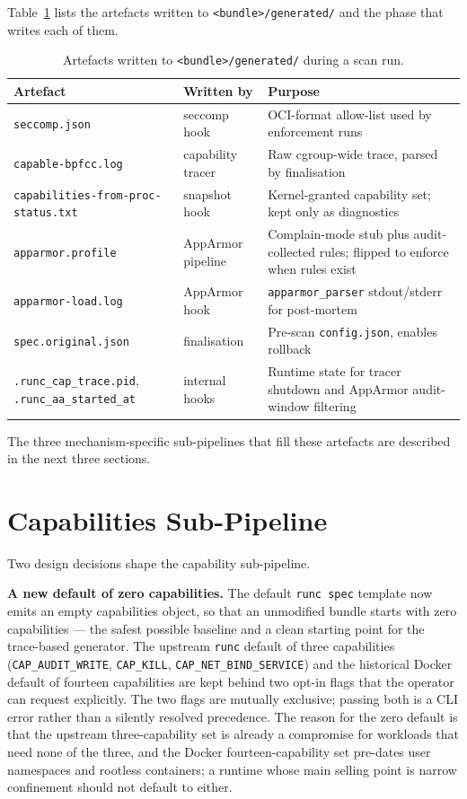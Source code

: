 Table~\ref{tab:artefacts} lists the artefacts written to \texttt{<bundle>/generated/} and the phase that writes each of them.

\begin{table}[ht]
\centering
\caption{Artefacts written to \texttt{<bundle>/generated/} during a scan run.}
\label{tab:artefacts}
\begin{tabular}{p{4.8cm}p{2.6cm}p{7.0cm}}
\toprule
\textbf{Artefact} & \textbf{Written by} & \textbf{Purpose} \\
\midrule
\texttt{seccomp.json} & seccomp hook & OCI-format allow-list used by enforcement runs \\
\texttt{capable-bpfcc.log} & capability tracer & Raw cgroup-wide trace, parsed by finalisation \\
\texttt{capabilities-from-proc-status.txt} & snapshot hook & Kernel-granted capability set; kept only as diagnostics \\
\texttt{apparmor.profile} & AppArmor pipeline & Complain-mode stub plus audit-collected rules; flipped to enforce when rules exist \\
\texttt{apparmor-load.log} & AppArmor hook & \texttt{apparmor\_parser} stdout/stderr for post-mortem \\
\texttt{spec.original.json} & finalisation & Pre-scan \texttt{config.json}, enables rollback \\
\texttt{.runc\_cap\_trace.pid}, \texttt{.runc\_aa\_started\_at} & internal hooks & Runtime state for tracer shutdown and AppArmor audit-window filtering \\
\bottomrule
\end{tabular}
\end{table}

The three mechanism-specific sub-pipelines that fill these artefacts are described in the next three sections.

\section{Capabilities Sub-Pipeline}\label{sec:design-caps}

Two design decisions shape the capability sub-pipeline.

\textbf{A new default of zero capabilities.} The default \texttt{runc spec} template now emits an empty capabilities object, so that an unmodified bundle starts with zero capabilities --- the safest possible baseline and a clean starting point for the trace-based generator. The upstream \texttt{runc} default of three capabilities (\texttt{CAP\_AUDIT\_WRITE}, \texttt{CAP\_KILL}, \texttt{CAP\_NET\_BIND\_SERVICE}) and the historical Docker default of fourteen capabilities are kept behind two opt-in flags that the operator can request explicitly. The two flags are mutually exclusive; passing both is a CLI error rather than a silently resolved precedence. The reason for the zero default is that the upstream three-capability set is already a compromise for workloads that need none of the three, and the Docker fourteen-capability set pre-dates user namespaces and rootless containers; a runtime whose main selling point is narrow confinement should not default to either.

